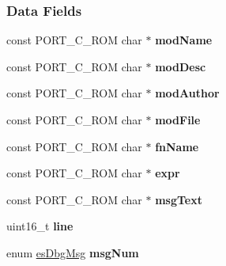 \subsubsection*{Data Fields}
\begin{DoxyCompactItemize}
\item 
\hypertarget{structesDbgReport_a36408531293748b90f8dff6450221f8e}{const P\-O\-R\-T\-\_\-\-C\-\_\-\-R\-O\-M char $\ast$ {\bfseries mod\-Name}}\label{structesDbgReport_a36408531293748b90f8dff6450221f8e}

\item 
\hypertarget{structesDbgReport_af5eb0b7c0c3571227eebe18a1021c97c}{const P\-O\-R\-T\-\_\-\-C\-\_\-\-R\-O\-M char $\ast$ {\bfseries mod\-Desc}}\label{structesDbgReport_af5eb0b7c0c3571227eebe18a1021c97c}

\item 
\hypertarget{structesDbgReport_a65c2230141505dd8ad88beed086c672e}{const P\-O\-R\-T\-\_\-\-C\-\_\-\-R\-O\-M char $\ast$ {\bfseries mod\-Author}}\label{structesDbgReport_a65c2230141505dd8ad88beed086c672e}

\item 
\hypertarget{structesDbgReport_aee9f8437e9c8e1dd590e8cd217208643}{const P\-O\-R\-T\-\_\-\-C\-\_\-\-R\-O\-M char $\ast$ {\bfseries mod\-File}}\label{structesDbgReport_aee9f8437e9c8e1dd590e8cd217208643}

\item 
\hypertarget{structesDbgReport_a447f326a4befb229f26182347613ade6}{const P\-O\-R\-T\-\_\-\-C\-\_\-\-R\-O\-M char $\ast$ {\bfseries fn\-Name}}\label{structesDbgReport_a447f326a4befb229f26182347613ade6}

\item 
\hypertarget{structesDbgReport_ae672502f0fa16e09179393ea42b096bc}{const P\-O\-R\-T\-\_\-\-C\-\_\-\-R\-O\-M char $\ast$ {\bfseries expr}}\label{structesDbgReport_ae672502f0fa16e09179393ea42b096bc}

\item 
\hypertarget{structesDbgReport_a24a9b1bfc91e4dba26b8f8c2b0d9debb}{const P\-O\-R\-T\-\_\-\-C\-\_\-\-R\-O\-M char $\ast$ {\bfseries msg\-Text}}\label{structesDbgReport_a24a9b1bfc91e4dba26b8f8c2b0d9debb}

\item 
\hypertarget{structesDbgReport_a98cc5a9cbc3df997fa991aa2fa7cf8f0}{uint16\-\_\-t {\bfseries line}}\label{structesDbgReport_a98cc5a9cbc3df997fa991aa2fa7cf8f0}

\item 
\hypertarget{structesDbgReport_ab8d811affe6dc9dcb7135cf114ff264c}{enum \hyperlink{group__dbg__intf_ga571a5933b00f4fdc98d1885a6b0f4613}{es\-Dbg\-Msg} {\bfseries msg\-Num}}\label{structesDbgReport_ab8d811affe6dc9dcb7135cf114ff264c}

\end{DoxyCompactItemize}


